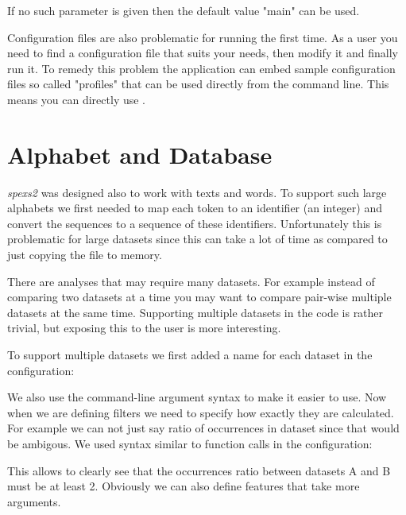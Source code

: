 If no such parameter is given then the default value "main" can be used.

Configuration files are also problematic for running the first time. As a user you need to find a configuration file that suits your needs, then modify it and finally run it. To remedy this problem the application can embed sample configuration files so called "profiles" that can be used directly from the command line. This means you can directly use .

\section{Alphabet and Database}

\emph{spexs2} was designed also to work with texts and words. To support such large alphabets we first needed to map each token to an identifier (an integer) and convert the sequences to a sequence of these identifiers. Unfortunately this is problematic for large datasets since this can take a lot of time as compared to just copying the file to memory.

There are analyses that may require many datasets. For example instead of comparing two datasets at a time you may want to compare pair-wise multiple datasets at the same time. Supporting multiple datasets in the code is rather trivial, but exposing this to the user is more interesting.

To support multiple datasets we first added a name for each dataset in the configuration:

\begin{file}
"Datasets" : {
    "A" : { "File" : "$A$" },
    "B" : { "File" : "$B$" },
    "C" : { "File" : "$C$" },
    ...
\end{file}

We also use the command-line argument syntax to make it easier to use. Now when we are defining filters we need to specify how exactly they are calculated. For example we can not just say ratio of occurrences in dataset since that would be ambigous. We used syntax similar to function calls in the configuration:

\begin{file}
...
"Extension": {
    "Outputtable": {
        "OccurencesRatio(A, B)" : {"min" : 2},
        ...
\end{file}

This allows to clearly see that the occurrences ratio between datasets A and B must be at least 2. Obviously we can also define features that take more arguments.

